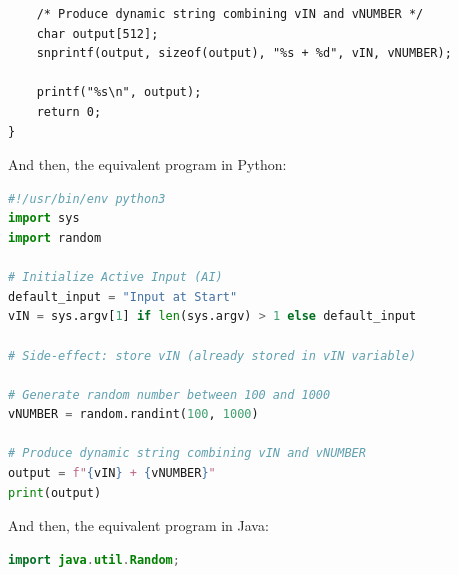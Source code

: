 \documentclass[a4paper, 18pt]{book} %
\begin{document}
{{{\begin{appendices}
\begin{tcolorbox}[myterminalstyle, title=C: TEA-like Sequence-Transformer Chaining Program Flow with String Template Processing, breakable]
\begin{lstlisting}
    /* Produce dynamic string combining vIN and vNUMBER */
    char output[512];
    snprintf(output, sizeof(output), "%s + %d", vIN, vNUMBER);

    printf("%s\n", output);
    return 0;
}
\end{lstlisting}
  \end{tcolorbox}



\vspace{2em}

And then, the equivalent program in Python:



  \begin{tcolorbox}[myterminalstyle, title=PYTHON: TEA-like Sequence-Transformer Chaining Program Flow with String Template Processing, breakable]
\begin{lstlisting}[language=Python,
backgroundcolor=\color{codebg},
basicstyle=\ttfamily\Large\color{codefg},
commentstyle=\color{comment}\itshape,
keywordstyle=\color{keyword}\bfseries,
stringstyle=\color{string},
showstringspaces=false,breaklines=true,frame=single]
#!/usr/bin/env python3
import sys
import random

# Initialize Active Input (AI)
default_input = "Input at Start"
vIN = sys.argv[1] if len(sys.argv) > 1 else default_input

# Side-effect: store vIN (already stored in vIN variable)

# Generate random number between 100 and 1000
vNUMBER = random.randint(100, 1000)

# Produce dynamic string combining vIN and vNUMBER
output = f"{vIN} + {vNUMBER}"
print(output)
\end{lstlisting}
  \end{tcolorbox}


\vspace{2em}

And then, the equivalent program in Java:


  \begin{tcolorbox}[myterminalstyle, title=JAVA: TEA-like Sequence-Transformer Chaining Program Flow with String Template Processing, breakable]
\begin{lstlisting}[language=Java,
backgroundcolor=\color{codebg},
basicstyle=\ttfamily\Large\color{codefg},
commentstyle=\color{comment}\itshape,
keywordstyle=\color{keyword}\bfseries,
stringstyle=\color{string},
showstringspaces=false,breaklines=true,frame=single]
import java.util.Random;


\end{lstlisting}
\end{tcolorbox}
\end{appendices}}}}
\end{document}
